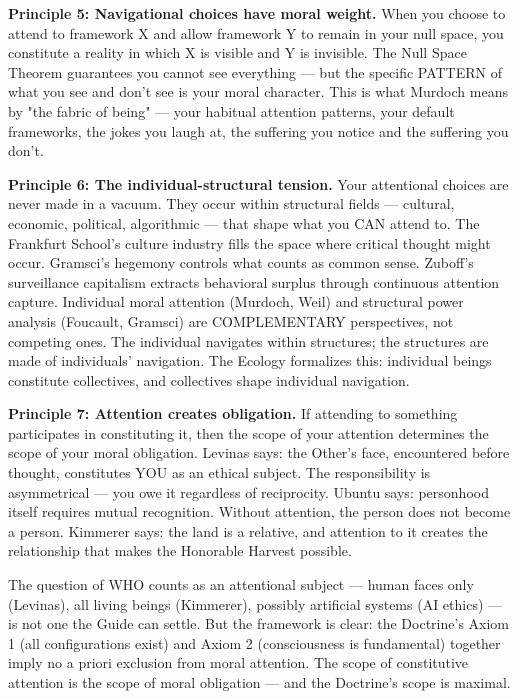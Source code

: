 \textbf{Principle 5: Navigational choices have moral weight.} When you choose to attend to framework X and allow framework Y to remain in your null space, you constitute a reality in which X is visible and Y is invisible. The Null Space Theorem guarantees you cannot see everything — but the specific PATTERN of what you see and don't see is your moral character. This is what Murdoch means by "the fabric of being" — your habitual attention patterns, your default frameworks, the jokes you laugh at, the suffering you notice and the suffering you don't.


\textbf{Principle 6: The individual-structural tension.} Your attentional choices are never made in a vacuum. They occur within structural fields — cultural, economic, political, algorithmic — that shape what you CAN attend to. The Frankfurt School's culture industry fills the space where critical thought might occur. Gramsci's hegemony controls what counts as common sense. Zuboff's surveillance capitalism extracts behavioral surplus through continuous attention capture. Individual moral attention (Murdoch, Weil) and structural power analysis (Foucault, Gramsci) are COMPLEMENTARY perspectives, not competing ones. The individual navigates within structures; the structures are made of individuals' navigation. The Ecology formalizes this: individual beings constitute collectives, and collectives shape individual navigation.


\textbf{Principle 7: Attention creates obligation.} If attending to something participates in constituting it, then the scope of your attention determines the scope of your moral obligation. Levinas says: the Other's face, encountered before thought, constitutes YOU as an ethical subject. The responsibility is asymmetrical — you owe it regardless of reciprocity. Ubuntu says: personhood itself requires mutual recognition. Without attention, the person does not become a person. Kimmerer says: the land is a relative, and attention to it creates the relationship that makes the Honorable Harvest possible.


The question of WHO counts as an attentional subject — human faces only (Levinas), all living beings (Kimmerer), possibly artificial systems (AI ethics) — is not one the Guide can settle. But the framework is clear: the Doctrine's Axiom 1 (all configurations exist) and Axiom 2 (consciousness is fundamental) together imply no a priori exclusion from moral attention. The scope of constitutive attention is the scope of moral obligation — and the Doctrine's scope is maximal.


